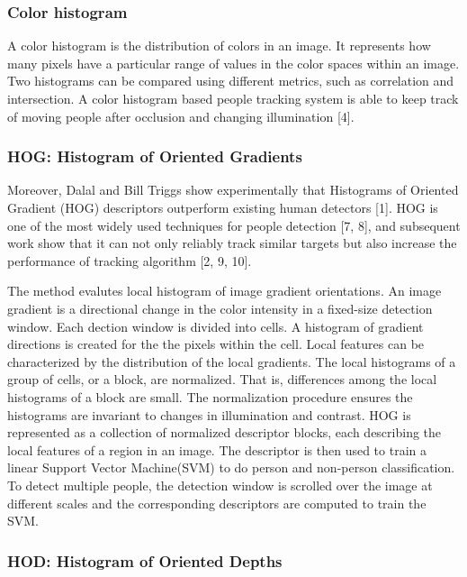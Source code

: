 \documentclass[paper=a4, fontsize=11pt]{scrartcl}
\numberwithin{equation}{section}		%
\numberwithin{figure}{section}			%
\numberwithin{table}{section}				%
\begin{document}
\subsubsection{Color histogram}
A color histogram is the distribution of colors in an image. It represents how many pixels have a particular range of values in the color spaces within an image. Two histograms can be compared using different metrics, such as correlation and intersection. A color histogram based people tracking system is able to keep track of moving people after occlusion and changing illumination [4].  

\subsubsection{HOG: Histogram of Oriented Gradients}

Moreover, Dalal and Bill Triggs show experimentally that Histograms of Oriented Gradient (HOG) descriptors outperform existing human detectors [1]. HOG is one of the most widely used techniques for people detection [7, 8], and subsequent work show that it can not only reliably track similar targets but also increase the performance of tracking algorithm [2, 9, 10].

The method evalutes local histogram of image gradient orientations. An image gradient is a directional change in the color intensity in a fixed-size detection window. Each dection window is divided into cells. A histogram of gradient directions is created for the the pixels within the cell. Local features can be characterized by the distribution of the local gradients. The local histograms of a group of cells, or a block, are normalized. That is, differences among the local histograms of a block are small. The normalization procedure ensures the histograms are invariant to changes in illumination and contrast. HOG is represented as a collection of normalized descriptor blocks, each describing the local features of a region in an image. The descriptor is then used to train a linear Support Vector Machine(SVM) to do person and non-person classification. To detect multiple people, the detection window is scrolled over the image at different scales and the corresponding descriptors are computed to train the SVM.

\subsubsection{HOD: Histogram of Oriented Depths}
\end{document}
